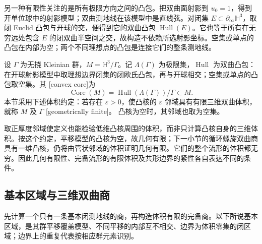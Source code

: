 另一种有限性关注的是所有极限方向之间的凸包。把双曲面射影到
\(u_0=1\)，得到开单位球中的射影模型；双曲测地线在该模型中是直线弦。对闭集
\(E\subset\partial_\infty\mathbb H^3\)，取闭 Euclid 凸包与开球的交，便得到它的双曲凸包
\(\operatorname{Hull}(E)\)。它也等于所有在无穷远处包含 \(E\) 的闭双曲半空间之交，故构造不依赖所选射影坐标。空集或单点的凸包在内部为空；两个不同理想点的凸包是连接它们的整条测地线。

\begin{definition}\label{g3:def:D-geometric-finiteness}
	设 \(\Gamma\) 为无挠 Kleinian 群，\(M=\mathbb H^3/\Gamma\)。记 \(\Lambda(\Gamma)\) 为极限集，\(\operatorname{Hull}\) 为双曲凸包：在开球射影模型中取理想边界闭集的闭欧氏凸包，再与开球相交；空集或单点的凸包取空集。其
	[convex core]为
	\[
		\operatorname{Core}(M)
		    =\operatorname{Hull}(\Lambda(\Gamma))/\Gamma\subset M.
	\]
	本节采用下述体积约定：若存在 \(\varepsilon>0\)，使凸核的
	\(\varepsilon\) 邻域具有有限三维双曲体积，就称 \(M\) 及 \(\Gamma\)
	[geometrically finite]。
	凸核为空时，其邻域也取为空集。
\end{definition}

取正厚度邻域使定义也能检验低维凸核周围的体积，而非只计算凸核自身的三维体积。按这个约定，平移模型的凸核为空，故几何有限；下一小节的循环螺旋双曲商具有一维凸核，仍将由管状邻域的体积证明几何有限。它们的整个流形的体积都无穷。因此几何有限性、完备流形的有限体积及共形边界的紧性各自表达不同的条件。

\subsection{基本区域与三维双曲商}
\label{g3:subsec:D04:06}

先计算一个只有一条基本闭测地线的商，再构造体积有限的完备商。以下所说基本区域，是其群平移覆盖模型、不同平移的内部互不相交、边界为体积零集的闭区域；边界上的重复代表按相应群元素识别。

